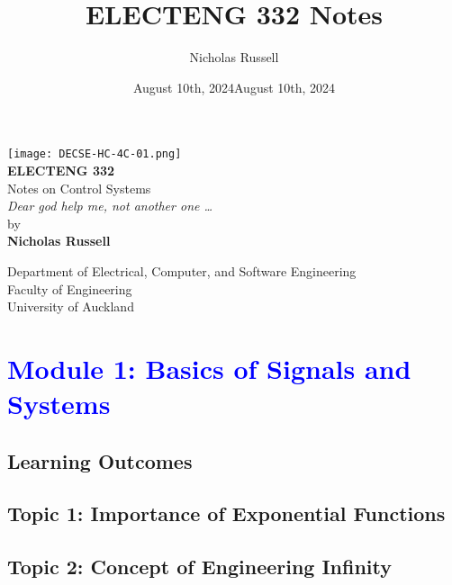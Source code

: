 \documentclass[12pt]{report}
\title{ELECTENG 332 Notes}
\author{Nicholas Russell}
\date{August 10th, 2024}
\begin{document}
\begin{titlepage}
\centering

\texttt{[image: DECSE-HC-4C-01.png]}\\[1cm] %


{\LARGE \textbf{ELECTENG 332}}\\[0.5cm]
{\Large Notes on Control Systems}\\[0.5cm]

{\textit{Dear god help me, not another one \dots}}\\[2cm]

{\large by}\\[0.3cm]
{\large \textbf{Nicholas Russell}}\\[1.4cm]
{\large \date{August 10th, 2024}}

\vfill %

{\large Department of Electrical, Computer, and Software Engineering}\\[0.3cm]
{\large Faculty of Engineering}\\[0.3cm]
{\large University of Auckland}




\end{titlepage}



\tableofcontents
\newpage

\chapter{\textcolor{blue}{Module 1: Basics of Signals and Systems}}

\section{Learning Outcomes}

\section{Topic 1: Importance of Exponential Functions}

\section{Topic 2: Concept of Engineering Infinity}
\end{document}
